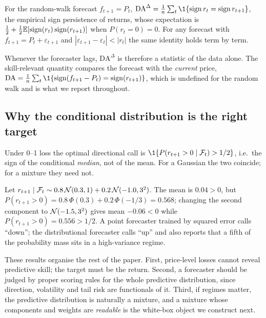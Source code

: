 \begin{proposition}\label{prop:da}
For the random-walk forecast $f_{t+1}=P_t$,
$\mathrm{DA}^{\Delta}=\frac1n\sum_t\1\{\operatorname{sign} r_t=\operatorname{sign} r_{t+1}\}$, the empirical
sign persistence of returns, whose expectation is
$\tfrac12+\tfrac12\mathbb{E}[\operatorname{sign}(r_t)\operatorname{sign}(r_{t+1})]$ when $P(r_t=0)=0$. For any forecast
with $f_{t+1}=P_t+\varepsilon_{t+1}$ and $|\varepsilon_{t+1}-\varepsilon_t|<|r_t|$ the same identity
holds term by term.
\end{proposition}

\noindent Whenever the forecaster lags, $\mathrm{DA}^{\Delta}$ is therefore a statistic of the data
alone. The skill-relevant quantity compares the forecast with the \emph{current} price,
$\mathrm{DA}=\frac1n\sum_t\1\{\operatorname{sign}(f_{t+1}-P_t)=\operatorname{sign}(r_{t+1})\}$, which is undefined for the
random walk and is what we report throughout.

\subsection{Why the conditional distribution is the right target}

Under 0--1 loss the optimal directional call is $\1\{P(r_{t+1}>0\mid\F_t)>1/2\}$, i.e.\ the sign of
the conditional \emph{median}, not of the mean. For a Gaussian the two coincide; for a mixture they
need not.

\begin{example}\label{ex:median}
Let $r_{t+1}\mid\mathcal{F}_t\sim 0.8\,\mathcal{N}(0.3,1)+0.2\,\mathcal{N}(-1.0,3^2)$. The mean is $0.04>0$, but
$P(r_{t+1}>0)=0.8\,\Phi(0.3)+0.2\,\Phi(-1/3)=0.568$; changing the second component to
$\mathcal{N}(-1.5,3^2)$ gives mean $-0.06<0$ while $P(r_{t+1}>0)=0.556>1/2$. A point forecaster trained by
squared error calls ``down''; the distributional forecaster calls ``up'' and also reports that a
fifth of the probability mass sits in a high-variance regime.
\end{example}

\noindent These results organise the rest of the paper. First, price-level losses
cannot reveal predictive skill; the target must be the return. Second, a forecaster should be judged
by proper scoring rules for the whole predictive distribution, since direction, volatility and tail
risk are functionals of it. Third, if regimes matter, the predictive distribution is naturally a
mixture, and a mixture whose components and weights are \emph{readable} is the white-box object
we construct next.
